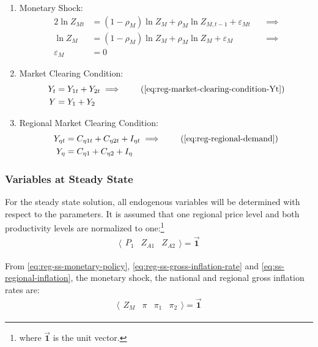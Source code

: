\documentclass[../thesis.tex]{subfiles}
\begin{document}
\begin{enumerate}
	\item Monetary Shock:
	\begin{alignat}{2}
		\ln{Z_{Mt}} &= (1-\rho_M)\ln{Z_{M}} + \rho_M\ln{Z_{M,t-1}} + \varepsilon_{Mt} \quad &\implies \nonumber \\
		\ln{Z_{M}} &= (1-\rho_M)\ln{Z_{M}} + \rho_M\ln{Z_{M}} + \varepsilon_{M} &\implies \nonumber \\
		\varepsilon_{M} &= 0 \label{eq:reg-ss-monetary-shock}
	\end{alignat}
	
	\item Market Clearing Condition:
	\begin{align}
		Y_{t} &= Y_{1 t} + Y_{2 t} \implies \tag{\ref{eq:reg-market-clearing-condition-Yt}} \\
		Y &= Y_{1} + Y_{2} \label{eq:reg-ss-market-clearing-condition}
	\end{align}
	
	\item Regional Market Clearing Condition:
	\begin{align}
		Y_{\eta t} &= C_{\eta 1 t} + C_{\eta 2 t} + I_{\eta t} \implies \tag{\ref{eq:reg-regional-demand}} \\
		Y_{\eta} &= C_{\eta 1} + C_{\eta 2} + I_{\eta} \label{eq:reg-ss-total-yn}
	\end{align}
	
\end{enumerate}


\subsubsection{Variables at Steady State}

	For the steady state solution, all endogenous variables will be determined with respect to the parameters. It is assumed that one regional price level and both productivity levels are normalized to one:\footnote{where $\vec{\bm{1}}$ is the unit vector.}
	\begin{align}
		\langle \begin{matrix} P_{1} & Z_{A1} & Z_{A2} \end{matrix} \rangle = \vec{\bm{1}} \label{eq:reg-ss-p1-za1}
	\end{align}
	
	From \ref{eq:reg-ss-monetary-policy}, \ref{eq:reg-ss-gross-inflation-rate} and \ref{eq:ss-regional-inflation}, the monetary shock, the national and regional gross inflation rates are:
	\begin{align}
		\langle \begin{matrix} Z_{M} & \pi & \pi_{1} & \pi_{2} \end{matrix} \rangle  = \vec{\bm{1}}
	\end{align}
	
\end{document}
